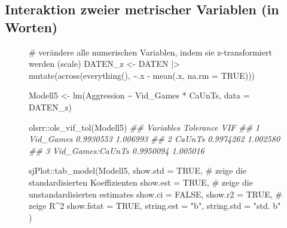 \documentclass[
  10pt,
  letterpaper,
  a4paper, twoside]{scrreprt}
\newenvironment{Shaded}{\begin{snugshade}}{\end{snugshade}}
\newcommand{\AttributeTok}[1]{\textcolor[rgb]{0.40,0.45,0.13}{#1}}
\newcommand{\CommentTok}[1]{\textcolor[rgb]{0.37,0.37,0.37}{#1}}
\newcommand{\ConstantTok}[1]{\textcolor[rgb]{0.56,0.35,0.01}{#1}}
\newcommand{\DocumentationTok}[1]{\textcolor[rgb]{0.37,0.37,0.37}{\textit{#1}}}
\newcommand{\FunctionTok}[1]{\textcolor[rgb]{0.28,0.35,0.67}{#1}}
\newcommand{\NormalTok}[1]{\textcolor[rgb]{0.00,0.23,0.31}{#1}}
\newcommand{\OtherTok}[1]{\textcolor[rgb]{0.00,0.23,0.31}{#1}}
\newcommand{\SpecialCharTok}[1]{\textcolor[rgb]{0.37,0.37,0.37}{#1}}
\newcommand{\StringTok}[1]{\textcolor[rgb]{0.13,0.47,0.30}{#1}}
\begin{document}
\subsection*{Interaktion zweier metrischer Variablen (in
Worten)}\label{interaktion-zweier-metrischer-variablen-in-worten}

\begin{figure}

\begin{Shaded}
\begin{Highlighting}[]

\CommentTok{\# verändere alle numerischen Variablen, indem sie z{-}transformiert werden (scale)}
\NormalTok{DATEN\_z }\OtherTok{\textless{}{-}}\NormalTok{ DATEN  }\SpecialCharTok{|\textgreater{}}
  \FunctionTok{mutate}\NormalTok{(}\FunctionTok{across}\NormalTok{(}\FunctionTok{everything}\NormalTok{(), }\SpecialCharTok{\textasciitilde{}}\NormalTok{.x }\SpecialCharTok{{-}} \FunctionTok{mean}\NormalTok{(.x, }\AttributeTok{na.rm =} \ConstantTok{TRUE}\NormalTok{))) }

\NormalTok{Modell5 }\OtherTok{\textless{}{-}} \FunctionTok{lm}\NormalTok{(Aggression }\SpecialCharTok{\textasciitilde{}}\NormalTok{ Vid\_Games }\SpecialCharTok{*}\NormalTok{ CaUnTs,}
              \AttributeTok{data =}\NormalTok{ DATEN\_z)}

\NormalTok{olsrr}\SpecialCharTok{::}\FunctionTok{ols\_vif\_tol}\NormalTok{(Modell5)}
\DocumentationTok{\#\#          Variables Tolerance      VIF}
\DocumentationTok{\#\# 1        Vid\_Games 0.9930553 1.006993}
\DocumentationTok{\#\# 2           CaUnTs 0.9974262 1.002580}
\DocumentationTok{\#\# 3 Vid\_Games:CaUnTs 0.9950094 1.005016}

\NormalTok{sjPlot}\SpecialCharTok{::}\FunctionTok{tab\_model}\NormalTok{(Modell5, }
                  \AttributeTok{show.std =} \ConstantTok{TRUE}\NormalTok{, }\CommentTok{\# zeige die standardisierten Koeffizienten}
                  \AttributeTok{show.est =} \ConstantTok{TRUE}\NormalTok{, }\CommentTok{\# zeige die unstandardisierten estimates}
                  \AttributeTok{show.ci =} \ConstantTok{FALSE}\NormalTok{,}
                  \AttributeTok{show.r2 =} \ConstantTok{TRUE}\NormalTok{, }\CommentTok{\# zeige R\^{}2}
                  \AttributeTok{show.fstat =} \ConstantTok{TRUE}\NormalTok{,}
                  \AttributeTok{string.est =} \StringTok{"b"}\NormalTok{,}
                  \AttributeTok{string.std =} \StringTok{"std. b"}
\NormalTok{                  )}
\end{Highlighting}
\end{Shaded}


\end{figure}
\end{document}
